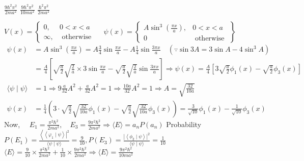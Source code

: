 \begin{enumerate}
\begin{tasks}
	\task[\textbf{B.}]$\frac{9 \hbar^{2} \pi^{2}}{2 m a^{2}}$
	\task[\textbf{C.}]$\frac{9 \hbar^{2} \pi^{2}}{10 m a^{2}}$
	\task[\textbf{D.}]$\frac{\hbar^{2} \pi^{2}}{2 m a^{2}}$
\end{tasks}
\begin{answer}
	$ V(x)=\left\{\begin{array}{ll}
	0, & 0<x<a \\
	\infty, & \text { otherwise }
	\end{array} \quad \psi(x)=\left\{\begin{array}{ll}
	A \sin ^{3}\left(\frac{\pi x}{a}\right), & 0<x<a \\
	0 & \text { otherwise }
	\end{array}\right\}\right.$\\
	$\begin{aligned}
	\psi(x) &=A \sin ^{3}\left(\frac{\pi x}{a}\right)=A \frac{3}{4} \sin \frac{\pi x}{a}-A \frac{1}{4} \sin \frac{3 \pi x}{a} \quad\left(\because \sin 3 A=3 \sin A-4 \sin ^{3} A\right) \\
	&=\frac{A}{4}\left[\sqrt{\frac{a}{2}} \sqrt{\frac{2}{a}} \times 3 \sin \frac{\pi x}{a}-\sqrt{\frac{a}{2}} \sqrt{\frac{2}{a}} \sin \frac{3 \pi x}{a}\right] \Rightarrow \psi(x)=\frac{A}{4}\left[3 \sqrt{\frac{a}{2}} \phi_{1}(x)-\sqrt{\frac{a}{2}} \phi_{3}(x)\right] \\
	\langle\psi \mid \psi\rangle &=1 \Rightarrow 9 \frac{a}{32} A^{2}+\frac{a}{32} A^{2}=1 \Rightarrow \frac{10 a}{32} A^{2}=1 \Rightarrow A=\sqrt{\frac{32}{10 a}} \\
	\psi(x) &=\frac{1}{4}\left(3 \cdot \sqrt{\frac{a}{2}} \sqrt{\frac{32}{10 a}} \phi_{1}(x)-\sqrt{\frac{a}{2}} \sqrt{\frac{32}{10 a}} \phi_{3}(x)\right)=\frac{3}{\sqrt{10}} \phi_{1}(x)-\frac{1}{\sqrt{10}} \phi_{3}(x)
	\end{aligned}$\\
	Now, $\quad E_{1}=\frac{\pi^{2} \hbar^{2}}{2 m a^{2}}, \quad E_{3}=\frac{9 \pi^{2} \hbar^{2}}{2 m a^{2}} \Rightarrow\langle E\rangle=a_{n} P\left(a_{n}\right)$
	Probability $P\left(E_{1}\right)=\frac{\left\langle\left.\left\langle\varphi_{1} \mid \psi\right\rangle\right|^{2}\right.}{\langle\psi \mid \psi\rangle}=\frac{9}{10}, P\left(E_{3}\right)=\frac{\left|\left\langle\phi_{2} \mid \psi\right\rangle\right|^{2}}{\langle\psi \mid \psi\rangle}=\frac{1}{10}$
	$\langle E\rangle=\frac{9}{10} \times \frac{\pi^{2} \hbar^{2}}{2 m a^{2}}+\frac{1}{10} \times \frac{9 \pi^{2} \hbar^{2}}{2 m a^{2}} \Rightarrow\langle E\rangle=\frac{9 \pi^{2} \hbar^{2}}{10 m a^{2}}$\\

\end{answer}
\end{enumerate}
